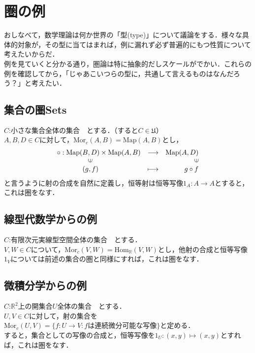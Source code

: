\documentclass[uplatex, 12pt, a4paper, dvipdfmx]{jsarticle}
\begin{document}
\clearpage
\section{圏の例}
おしなべて，数学理論は何か世界の「型(type)」について議論をする．様々な具体的対象が，その型に当てはまれば，例に漏れず必ず普遍的にもつ性質について考えたいからだ．\\
例を見ていくと分かる通り，圏論は特に抽象的だしスケールがでかい．これらの例を確認してから，「じゃあこいつらの型に，共通して言えるものはなんだろう？」と考えたい．

\subsection{集合の圏\bf{Sets}}

$C$:小さな集合全体の集合　とする．（すると$C\in\mathfrak{U}$）\\
$A,B,D\in C$に対して，$\mathrm{Mor}_c(A,B)=\mathrm{Map}(A,B)$とし，$$\begin{array}{lcr}\circ : \mathrm{Map}(B,D)\times\mathrm{Map}(A,B)&\longrightarrow&\mathrm{Map}(A,D)\\ \hspace{16mm}\rotatebox{90}{$\in$} & & \rotatebox{90}{$\in$}\\ \hspace{13mm}(g,f) & \longmapsto & g\circ f \end{array}$$
と言うように射の合成を自然に定義し，恒等射は恒等写像$1_A:A\longrightarrow A$とすると，これは圏をなす．

\subsection{線型代数学からの例}

$C$:有限次元実線型空間全体の集合　とする．\\
$V,W\in C$について，$\mathrm{Mor}_c(V,W)=\mathrm{Hom}_\mathbb{R}(V,W)$とし，他射の合成と恒等写像$1_V$については前述の集合の圏と同様にすれば，これは圏をなす．

\subsection{微積分学からの例}

$C$:$\mathbb{R}^2$上の開集合$U$全体の集合　とする．\\
$U,V\in C$に対して，射の集合を$\mathrm{Mor}_c(U,V)=\{f:U\longrightarrow V: f\text{は連続微分可能な写像}\}$と定める．\\
すると，集合としての写像の合成と，恒等写像を$1_U:(x,y)\longmapsto (x,y)$とすれば，これは圏をなす．
\end{document}
